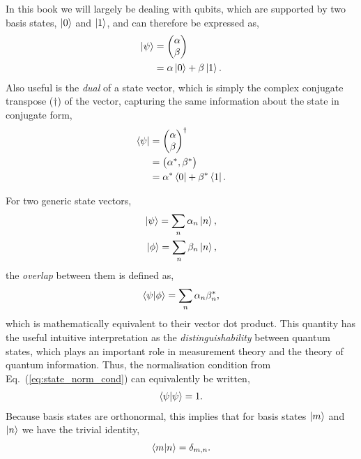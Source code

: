 \documentclass[aps,pra,twocolumn,amsmath,amssymb,nofootinbib,superscriptaddress]{revtex4}
\begin{document}
In this book we will largely be dealing with qubits, which are supported by two basis states, $\ket{0}$ and $\ket{1}$, and can therefore be expressed as,
\begin{align}
\ket\psi &= \left(\begin{matrix}{}
	\alpha \\
	\beta
\end{matrix}\right)\nonumber\\
&= \alpha\ket{0} + \beta\ket{1}.
\end{align}
Also useful is the \textit{dual} of a state vector, which is simply the complex conjugate transpose ($\dag$) of the vector, capturing the same information about the state in conjugate form,
\begin{align}
\bra\psi &= \left(\begin{matrix}{}
	\alpha \\
	\beta
\end{matrix}\right)^\dag\nonumber\\
&=\left(\begin{matrix}{}
	\alpha^*, \beta^*
\end{matrix}\right)\nonumber\\
&= \alpha^*\bra{0} + \beta^*\bra{1}.
\end{align}

For two generic state vectors,
\begin{align}
	\ket\psi = \sum_n \alpha_n \ket{n},\nonumber\\
	\ket\phi = \sum_n \beta_n \ket{n},
\end{align}
the \textit{overlap} between them is defined as,
\begin{align}
\braket{\psi|\phi} = \sum_n \alpha_n\beta_n^*,
\end{align}
which is mathematically equivalent to their vector dot product. This quantity has the useful intuitive interpretation as the \textit{distinguishability} between quantum states, which plays an important role in measurement theory and the theory of quantum information. Thus, the normalisation condition from Eq.~(\ref{eq:state_norm_cond}) can equivalently be written,
\begin{align}
\braket{\psi|\psi} = 1.	
\end{align}
Because basis states are orthonormal, this implies that for basis states $\ket{m}$ and $\ket{n}$ we have the trivial identity,
\begin{align}
	\braket{m|n}=\delta_{m,n}.
\end{align}
\end{document}
